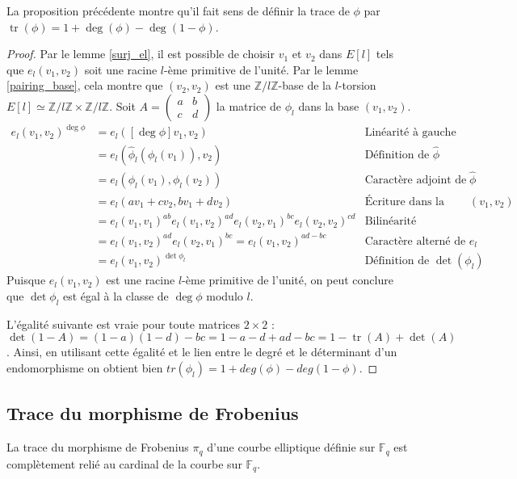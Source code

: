\documentclass{article}
\theoremstyle{plain}%
\theoremstyle{definition}%
\newcommand{\F}{\mathbb{F}}
\newcommand{\Z}{\mathbb{Z}}
\newcommand{\h}{\widehat}
\DeclareMathOperator{\tr}{tr}
\begin{document}
La proposition précédente montre qu'il fait sens de définir la trace de $\phi$ par $\tr(\phi) = 1 + \deg(\phi) - \deg(1-\phi)$.

\begin{proof}
  Par le lemme \ref{surj_el}, il est possible de choisir $v_1$ et $v_2$ dans $E[l]$ tels que $e_l(v_1, v_2)$ soit une racine $l$-ème primitive de l'unité. Par le lemme \ref{pairing_base}, cela montre que $(v_2, v_2)$ est une $\Z/l\Z$-base de la $l$-torsion $E[l] \simeq \Z/l\Z\times\Z/l\Z$. 
  Soit $A = \begin{pmatrix} a & b \\ c & d \end{pmatrix}$ la matrice de $\phi_l$ dans la base $(v_1, v_2)$.
  \begin{align*}
  e_l(v_1, v_2)^{\deg\phi} 
  &= e_l([\deg\phi]v_1, v_2) & \text{Linéarité à gauche} \\
  &= e_l(\h\phi_l(\phi_l(v_1)), v_2) & \text{Définition de $\h\phi$} \\
  &= e_l(\phi_l(v_1), \phi_l(v_2)) & \text{Caractère adjoint de $\h\phi$} \\
  &= e_l(av_1+cv_2, bv_1+dv_2) & \text{Écriture dans la base $(v_1, v_2)$} \\
  &= e_l(v_1, v_1)^{ab} e_l(v_1, v_2)^{ad} e_l(v_2, v_1)^{bc} e_l(v_2, v_2)^{cd} & \text{Bilinéarité} \\
  &= e_l(v_1, v_2)^{ad} e_l(v_2, v_1)^{bc} = e_l(v_1, v_2)^{ad-bc} & \text{Caractère alterné de $e_l$} \\
  &= e_l(v_1, v_2)^{\det\phi_l} & \text{Définition de $\det(\phi_l)$}
  \end{align*}
  Puisque $e_l(v_1, v_2)$ est une racine $l$-ème primitive de l'unité, on peut conclure que $\det\phi_l$ est égal à la classe de $\deg\phi$ modulo $l$.

   L'égalité suivante est vraie pour toute matrices $2\times 2$ : $\det(1-A) = (1-a)(1-d) - bc = 1 -a -d + ad -bc = 1 - \tr(A) + \det(A)$. Ainsi, en utilisant cette égalité et le lien entre le degré et le déterminant d'un endomorphisme on obtient bien $tr(\phi_l) = 1 + deg(\phi) - deg(1-\phi)$.   
\end{proof}

\subsection{Trace du morphisme de Frobenius}

La trace du morphisme de Frobenius $\pi_q$ d'une courbe elliptique définie sur $\F_q$ est complètement relié au cardinal de la courbe sur $\F_q$.
\end{document}
